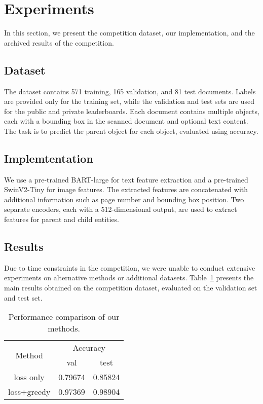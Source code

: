 \section{Experiments}
In this section, we present the competition dataset, our implementation, and the archived results of the competition.
\label{sec:experiments}
\subsection{Dataset}
The dataset contains 571 training, 165 validation, and 81 test documents. Labels are provided only for the training set, while the validation and test sets are used for the public and private leaderboards. Each document contains multiple objects, each with a bounding box in the scanned document and optional text content. The task is to predict the parent object for each object, evaluated using accuracy.
\subsection{Implemtentation}
We use a pre-trained BART-large \cite{lewis2019bart} for text feature extraction and a pre-trained SwinV2-Tiny \cite{liu2022swin} for image features. The extracted features are concatenated with additional information such as page number and bounding box position. Two separate encoders, each with a 512-dimensional output, are used to extract features for parent and child entities.
\subsection{Results}
Due to time constraints in the competition, we were unable to conduct extensive experiments on alternative methods or additional datasets. Table~\ref{tab:result} presents the main results obtained on the competition dataset, evaluated on the validation set and test set.
\begin{table}[h]
\centering
\begin{tabular}{c|cc}
\multirow{2}{*}{Method}          & \multicolumn{2}{c}{Accuracy}                              \\ \cline{2-3} 
                                 & val                         & test                        \\ \hline
loss only                        & 0.79674                     & 0.85824                     \\
\multicolumn{1}{l|}{loss+greedy} & \multicolumn{1}{l}{0.97369} & \multicolumn{1}{l}{0.98904}
\end{tabular}
\caption{Performance comparison of our methods.}
\label{tab:result}
\end{table}
